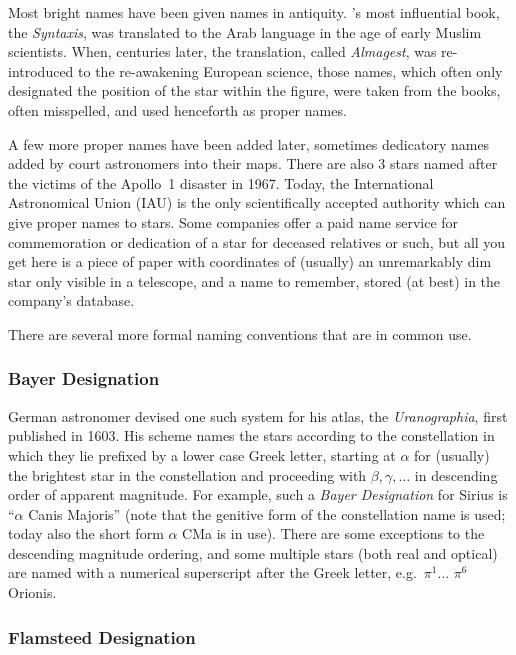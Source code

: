 Most bright names have been given names in antiquity. 's most
influential book, the \emph{Syntaxis}, was translated to the Arab
language in the age of early Muslim scientists. When, centuries later,
the translation, called \emph{Almagest}, was re-introduced to the
re-awakening European science, those names, which often only designated
the position of the star within the figure, were taken from the books,
often misspelled, and used henceforth as proper names.

A few more proper names have been added later, sometimes dedicatory
names added by court astronomers into their maps. There are also 3
stars named after the victims of the Apollo~1 disaster in 1967.
Today, the International Astronomical Union (IAU) is the only
scientifically accepted authority which can give proper names to
stars. Some companies offer a paid name service for commemoration or
dedication of a star for deceased relatives or such, but all you get
here is a piece of paper with coordinates of (usually) an unremarkably
dim star only visible in a telescope, and a name to remember, stored
(at best) in the company's database.

There are several more formal naming conventions that are in common use.

\subsubsection{Bayer Designation}
\label{sec:Phenomena:StarNames:Bayer}

German astronomer  devised one such system for his
atlas, the \emph{Uranographia}, first published in 1603. His scheme
names the stars according to the constellation in which they lie
prefixed by a lower case Greek letter, starting at $\alpha$ for
(usually) the brightest star in the constellation and proceeding with
$\beta, \gamma, \ldots$ in descending order of apparent magnitude. For
example, such a \emph{Bayer Designation} for Sirius is ``$\alpha$
Canis Majoris'' (note that the genitive form of the constellation name
is used; today also the short form $\alpha$ CMa is in use). There are
some exceptions to the descending magnitude ordering, and some
multiple stars (both real and optical) are named with a numerical
superscript after the Greek letter, e.g.\ $\pi^1$...  $\pi^6$ Orionis.

\subsubsection{Flamsteed Designation}
\label{sec:Phenomena:StarNames:Flamsteed}

